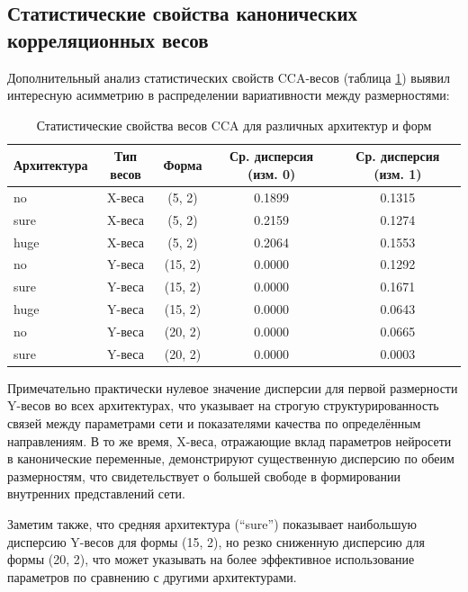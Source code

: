 \documentclass[a4paper,12pt]{article}
\begin{document}
\subsection{Статистические свойства канонических корреляционных весов}

Дополнительный анализ статистических свойств CCA-весов (таблица \ref{tab:cca_stats}) выявил интересную
асимметрию в распределении вариативности между размерностями:

\begin{table}[ht]
  \centering
  \label{tab:cca_stats}
  \begin{tabular}{|l|c|c|c|c|}
    \hline
    \textbf{Архитектура} & \textbf{Тип весов} & \textbf{Форма} & \textbf{Ср. дисперсия (изм. 0)} &
    \textbf{Ср. дисперсия (изм. 1)} \\
    \hline
    no & X-веса & (5, 2) & 0.1899 & 0.1315 \\
    sure & X-веса & (5, 2) & 0.2159 & 0.1274 \\
    huge & X-веса & (5, 2) & 0.2064 & 0.1553 \\
    \hline
    no & Y-веса & (15, 2) & 0.0000 & 0.1292 \\
    sure & Y-веса & (15, 2) & 0.0000 & 0.1671 \\
    huge & Y-веса & (15, 2) & 0.0000 & 0.0643 \\
    \hline
    no & Y-веса & (20, 2) & 0.0000 & 0.0665 \\
    sure & Y-веса & (20, 2) & 0.0000 & 0.0003 \\
    \hline
  \end{tabular}
  \caption{Статистические свойства весов CCA для различных архитектур и форм}
\end{table}

Примечательно практически нулевое значение дисперсии для первой размерности Y-весов во всех архитектурах, что
указывает на строгую структурированность связей между параметрами сети и показателями качества по
определённым направлениям. В то же время, X-веса, отражающие вклад параметров нейросети в канонические
переменные, демонстрируют существенную дисперсию по обеим размерностям, что свидетельствует о большей свободе
в формировании внутренних представлений сети.

Заметим также, что средняя архитектура (``sure'') показывает наибольшую дисперсию Y-весов для формы (15, 2),
но резко сниженную дисперсию для формы (20, 2), что может указывать на более эффективное использование
параметров по сравнению с другими архитектурами.
\end{document}
